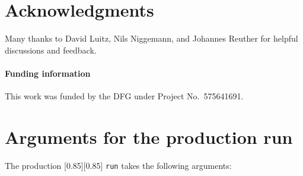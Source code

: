 \documentclass{SciPost}
\newcommand{\pyinline}[1]{\begingroup\setlength{\fboxsep}{0pt}%
  \colorbox{gray!15}{\raisebox{0pt}[0.85\ht\strutbox][0.85\dp\strutbox]{%
    \hspace{1pt}\lstinline{#1}\hspace{1pt}}}\endgroup}
\begin{document}
\section*{Acknowledgments}
Many thanks to David Luitz, Nils Niggemann, and Johannes Reuther for helpful discussions and feedback.

\paragraph{Funding information}
This work was funded by the DFG under Project No.~575641691.



\appendix
\section{Arguments for the production run}\label{app:run_input}
The production \pyinline{run} takes the following arguments:
\end{document}
